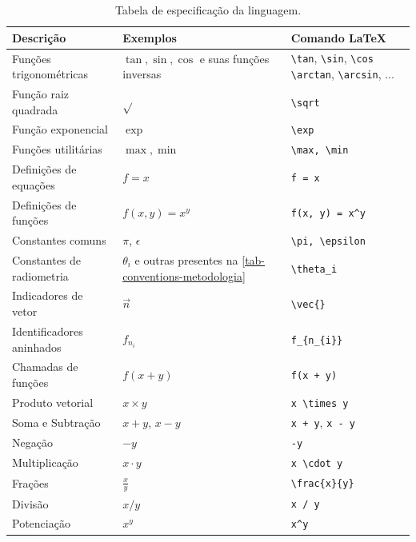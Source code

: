 \begin{table}[htbp]
\centering
\begin{tabular}{|l|l|l|}
\hline
    \textbf{Descrição} & \textbf{Exemplos} & \textbf{Comando \LaTeX{}} \\ \hline

    \small Funções trigonométricas & $\tan, \sin, \cos$ {\small e suas funções inversas}
    &\small\verb"\tan", \verb"\sin", \verb"\cos"
    \newline\verb"\arctan", \verb"\arcsin", $\dots$
    \\ \hline
\small Função raiz quadrada & $\sqrt{}$ & \verb|\sqrt| \\ \hline
\small Função exponencial & $\exp{}$ & \verb|\exp| \\ \hline
\small Funções utilitárias & $\max, \min$ & \verb|\max, \min| \\ \hline
\small Definições de equações & $f = x$ & \verb|f = x| \\ \hline
\small Definições de funções & $f(x, y) = x^y$ & \verb|f(x, y) = x^y| \\ \hline
\small Constantes comuns & $\pi$, $\epsilon$ & \verb|\pi, \epsilon| \\ \hline
\small Constantes de radiometria & $\theta_i$ {\small e outras presentes na \autoref{tab-conventions-metodologia}} & \verb|\theta_i| \\ \hline
\small Indicadores de vetor & $\vec{n}$ & \verb|\vec{}| \\ \hline
\small Identificadores aninhados & $f_{n_{i}}$ & \verb|f_{n_{i}}| \\ \hline
\small Chamadas de funções & $f(x + y)$ & \verb|f(x + y)| \\ \hline
\small Produto vetorial & $x \times y$ & \verb|x \times y| \\ \hline
\small Soma e Subtração & $x + y$, $x - y$ & \verb|x + y|, \verb|x - y| \\ \hline
\small Negação & $-y$ & \verb|-y| \\ \hline
\small Multiplicação & $x \cdot y$ & \verb|x \cdot y| \\ \hline
\small Frações & $\frac{x}{y}$ & \verb|\frac{x}{y}| \\ \hline
\small Divisão & $x / y$ & \verb|x / y| \\ \hline
\small Potenciação & $x^y$ & \verb|x^y| \\ \hline
\end{tabular}
\caption{Tabela de especificação da linguagem.}
\label{tab-definition-of-lang}
\end{table}

